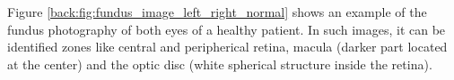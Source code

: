 Figure \ref{back:fig:fundus_image_left_right_normal} shows an example of the fundus photography of both eyes of a healthy patient. In such images, it can be identified zones like central and peripherical retina, macula (darker part located at the center) and the optic disc (white spherical structure inside the retina).

\begin{figure}[ht!]
	\centering
\end{figure}
